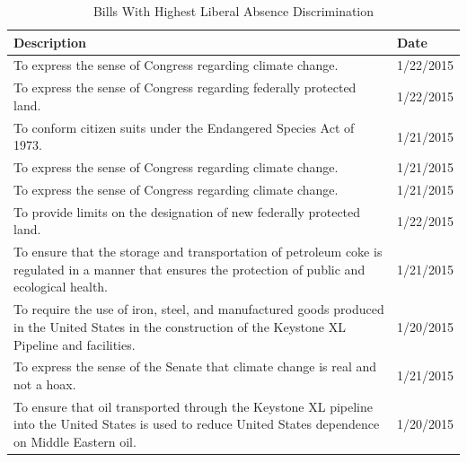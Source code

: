 	\begin{table}[!h]
		\centering
		\caption{Bills With Highest Liberal Absence Discrimination}
		\label{con_bills}
		\begin{tabular}{p{6in}l}
			Description                                                                                                                                              & Date      \\
			\midrule
			To express the sense of Congress regarding climate change.                                                                                               & 1/22/2015 \\
			To express the sense of Congress regarding federally protected land.                                                                                     & 1/22/2015 \\
			To conform citizen suits under the Endangered Species Act of 1973.                                                                                       & 1/21/2015 \\
			To express the sense of Congress regarding climate change.                                                                                               & 1/21/2015 \\
			To express the sense of Congress regarding climate change.                                                                                               & 1/21/2015 \\
			To provide limits on the designation of new federally protected land.                                                                                    & 1/22/2015 \\
			To ensure that the storage and transportation of petroleum coke is regulated in a manner that ensures the protection of public and ecological health.    & 1/21/2015 \\
			To require the use of iron, steel, and manufactured goods produced in the United States in the construction of the Keystone XL Pipeline and facilities.  & 1/20/2015 \\
			To express the sense of the Senate that climate change is real and not a hoax.                                                                           & 1/21/2015 \\
			To ensure that oil transported through the Keystone XL pipeline into the United States is used to reduce United States dependence on Middle Eastern oil. & 1/20/2015
		\end{tabular}
	\end{table}

